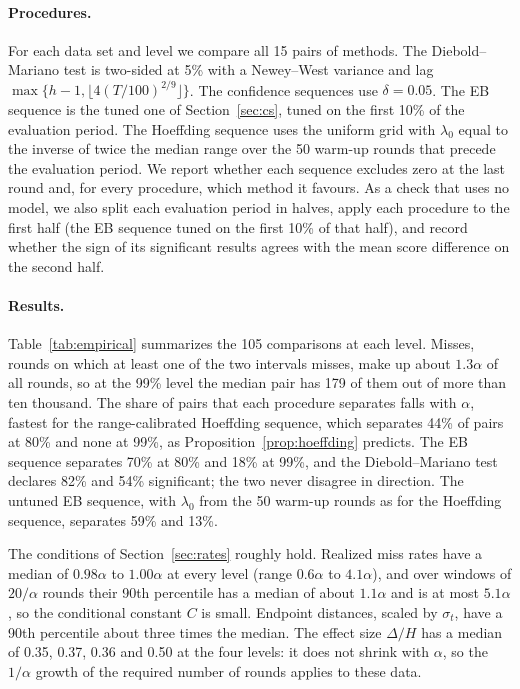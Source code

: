 \paragraph{Procedures.}
For each data set and level we compare all 15 pairs of methods. The
Diebold--Mariano test is two-sided at 5\% with a Newey--West variance and
lag $\max\{h-1,\lfloor4(T/100)^{2/9}\rfloor\}$. The confidence sequences use
$\delta=0.05$. The EB sequence is the tuned one of Section~\ref{sec:cs},
tuned on the first 10\% of the evaluation period. The Hoeffding sequence
uses the uniform grid with $\lambda_0$ equal to the inverse of twice the
median range over the 50 warm-up rounds that precede the evaluation
period. We report whether each sequence excludes zero at
the last round and, for every procedure, which method it favours. As a check that uses
no model, we also split each evaluation period in halves, apply each
procedure to the first half (the EB sequence tuned on the first 10\% of
that half), and record whether the sign of its significant
results agrees with the mean score difference on the second half.

\paragraph{Results.}
Table~\ref{tab:empirical} summarizes the 105 comparisons at each level.
Misses, rounds on which at least one of the two intervals misses, make up
about $1.3\alpha$ of all rounds,
so at the 99\% level the median pair has 179 of them out of more than ten
thousand. The share of
pairs that each procedure separates falls with $\alpha$, fastest for the
range-calibrated Hoeffding sequence, which separates 44\% of pairs at 80\%
and none at 99\%, as Proposition~\ref{prop:hoeffding} predicts. The EB
sequence separates 70\% at 80\% and 18\% at 99\%, and the Diebold--Mariano
test declares 82\% and 54\% significant; the two never disagree in
direction. The untuned EB sequence, with $\lambda_0$ from the 50 warm-up
rounds as for the Hoeffding sequence, separates 59\% and 13\%.

The conditions of Section~\ref{sec:rates} roughly hold. Realized miss
rates have a median of $0.98\alpha$ to $1.00\alpha$ at every level (range
$0.6\alpha$ to $4.1\alpha$), and over windows of $20/\alpha$ rounds their
90th percentile has a median of about $1.1\alpha$ and is at most
$5.1\alpha$, so the conditional constant $C$ is small. Endpoint distances,
scaled by $\sigma_t$, have a 90th percentile about three times the median.
The effect size $\Delta/H$ has a median of 0.35, 0.37, 0.36 and 0.50 at
the four levels: it does not shrink with $\alpha$, so the $1/\alpha$ growth
of the required number of rounds applies to these data.


